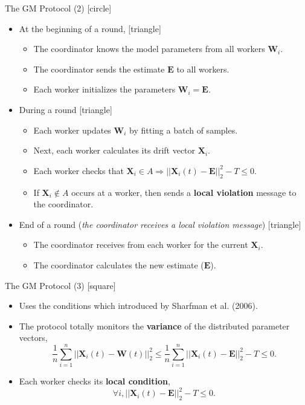 \begin{frame}{The GM Protocol (2)}
    [circle]
    \begin{itemize}
        \item{At the beginning of a round,
        [triangle]
        \begin{itemize}
            \item{The coordinator knows the model parameters from all workers $\pmb{W}_i$.}
            \item{The coordinator sends the estimate $\pmb{E}$ to all workers.}
            \item{Each worker initializes the parameters $\pmb{W}_i=\pmb{E}$.}
        \end{itemize}}
        \item{During a round
        [triangle]
        \begin{itemize}
            \item{Each worker updates $\pmb{W}_i$ by fitting a batch of samples.}
            \item{Next, each worker calculates its drift vector $\pmb{X}_i$.}
            \item{Each worker checks that $\pmb{X}_i\in A\Rightarrow||\pmb{X}_i(t)-\pmb{E}||_2^2 - T \leq 0$.}
            \item{If $\pmb{X}_i\not\in A$ occurs at a worker, then sends a \textbf{local violation} message to the coordinator.}
        \end{itemize}}
        \item{End of a round (\emph{the coordinator receives a local violation message})
        [triangle]
        \begin{itemize}
            \item{The coordinator receives from each worker for the current $\pmb{X}_i$.}
            \item{The coordinator calculates the new estimate ($\pmb{E}$).}
        \end{itemize}}
    \end{itemize}
\end{frame}

\begin{frame}{The GM Protocol (3)}
    [square]
    \begin{itemize}
        \item{Uses the conditions which introduced by Sharfman et al. (2006).}
        \vspace{0.4cm}
        \item{The protocol totally monitors the \textbf{variance} of the distributed parameter vectors,
        \[\frac{1}{n}\sum_{i=1}^n||\pmb{X}_i(t)-\pmb{W}(t)||_2^2 \leq \frac{1}{n}\sum_{i=1}^n||\pmb{X}_i(t)-\pmb{E}||_2^2 - T \leq 0.\]}
        \vspace{-0.4cm}
        \item{Each worker checks its \textbf{local condition},
        \[\forall i,||\pmb{X}_i(t)-\pmb{E}||_2^2 - T \leq 0.\]}
    \end{itemize}
\end{frame}

